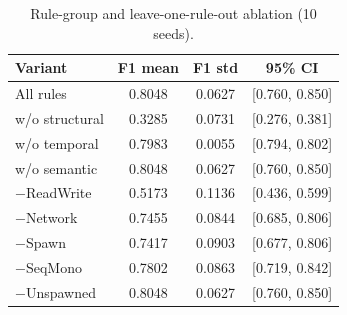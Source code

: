 \begin{table}[t]
\centering
\small
\caption{Rule-group and leave-one-rule-out ablation (10 seeds).}
\label{tab:ablation}
\begin{tabular}{lccc}
\toprule
Variant & F1 mean & F1 std & 95\% CI \\
\midrule
All rules & 0.8048 & 0.0627 & [0.760, 0.850] \\
w/o structural & 0.3285 & 0.0731 & [0.276, 0.381] \\
w/o temporal & 0.7983 & 0.0055 & [0.794, 0.802] \\
w/o semantic & 0.8048 & 0.0627 & [0.760, 0.850] \\
$-$ReadWrite & 0.5173 & 0.1136 & [0.436, 0.599] \\
$-$Network & 0.7455 & 0.0844 & [0.685, 0.806] \\
$-$Spawn & 0.7417 & 0.0903 & [0.677, 0.806] \\
$-$SeqMono & 0.7802 & 0.0863 & [0.719, 0.842] \\
$-$Unspawned & 0.8048 & 0.0627 & [0.760, 0.850] \\
\bottomrule
\end{tabular}
\end{table}
